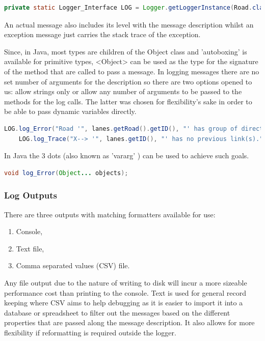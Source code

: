 \begin{lstlisting}[language=java]
	private static Logger_Interface LOG = Logger.getLoggerInstance(Road.class.getSimpleName());
\end{lstlisting}

An actual message also includes its level with the message description whilst an exception message just carries the stack trace of the exception.

Since, in Java, most types are children of the Object class and 'autoboxing'\cite{Oracle1995} is available for primitive types, <Object> can be used as the type for the signature of the method that are called to pass a message. In logging messages there are no set number of arguments for the description so there are two options opened to us: allow strings only or allow any number of arguments to be passed to the methods for the log calls. The latter was chosen for flexibility's sake in order to be able to pass dynamic variables directly.

\begin{lstlisting}[language=Java]
	LOG.log_Error("Road '", lanes.getRoad().getID(), "' has group of directed lanes with partly implemented Links (Back). ", link_count, "/", lanes.getNumberOfLanes(), " Lanes connected to a link.");
	LOG.log_Trace("X--> '", lanes.getID(), "' has no previous link(s).");
\end{lstlisting} 

In Java the 3 dots (also known as 'vararg' \cite{Oracle2004}) can be used to achieve such goals.

\begin{lstlisting}[language=Java]
	void log_Error(Object... objects);
\end{lstlisting}

\subsubsection{Log Outputs}
There are three outputs with matching formatters available for use:
\begin{enumerate}
	\item Console,
	\item Text file,
	\item Comma separated values (CSV) file.
\end{enumerate}

Any file output due to the nature of writing to disk will incur a more sizeable performance cost than printing to the console. Text is used for general record keeping where CSV aims to help debugging as it is easier to import it into a database or spreadsheet to filter out the messages based on the different properties that are passed along the message description. It also allows for more flexibility if reformatting is required outside the logger.



